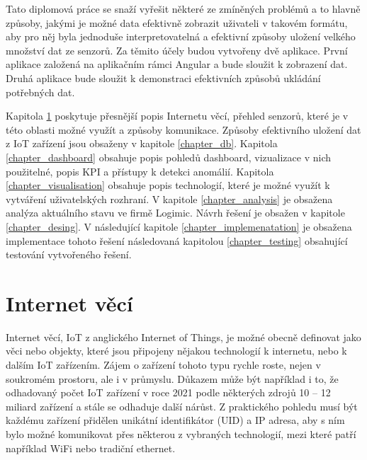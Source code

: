 Tato diplomová práce se snaží vyřešit některé ze zmíněných problémů a to hlavně způsoby, jakými je možné data efektivně zobrazit uživateli v takovém formátu, aby pro něj byla jednoduše interpretovatelná a efektivní způsoby uložení velkého množství dat ze senzorů. Za těmito účely budou vytvořeny dvě aplikace. První aplikace založená na aplikačním rámci Angular a bude sloužit k zobrazení dat. Druhá aplikace bude sloužit k demonstraci efektivních způsobů ukládání potřebných dat.

Kapitola \ref{chapter_iot} poskytuje přesnější popis Internetu věcí, přehled senzorů, které je v této oblasti možné využít a způsoby komunikace. Způsoby efektivního uložení dat z IoT zařízení jsou obsaženy v kapitole \ref{chapter_db}. Kapitola \ref{chapter_dashboard} obsahuje popis pohledů dashboard, vizualizace v nich použitelné, popis KPI a přístupy k detekci anomálií. Kapitola \ref{chapter_visualisation} obsahuje popis technologií, které je možné využít k vytváření uživatelských rozhraní. V kapitole \ref{chapter_analysis} je obsažena analýza aktuálního stavu ve firmě Logimic. Návrh řešení je obsažen v kapitole \ref{chapter_desing}. V následující kapitole \ref{chapter_implemenatation} je obsažena implementace tohoto řešení následovaná kapitolou \ref{chapter_testing} obsahující testování vytvořeného řešení.

\chapter{Internet věcí}
\label{chapter_iot}
Internet věcí, IoT z anglického Internet of Things, je možné obecně definovat jako věci nebo objekty, které jsou připojeny nějakou technologií k internetu, nebo k dalším IoT zařízením. Zájem o zařízení tohoto typu rychle roste, nejen v soukromém prostoru, ale i v průmyslu. Důkazem může být například i to, že odhadovaný počet IoT zařízení v roce 2021 podle některých zdrojů 10 -- 12 miliard zařízení \cite{iotAnalytics_2021, holst_2021} a stále se odhaduje další nárůst. Z praktického pohledu musí být každému zařízení přidělen unikátní identifikátor (UID) a IP adresa, aby s ním bylo možné komunikovat přes některou z vybraných technologií, mezi které patří například WiFi nebo tradiční ethernet.

